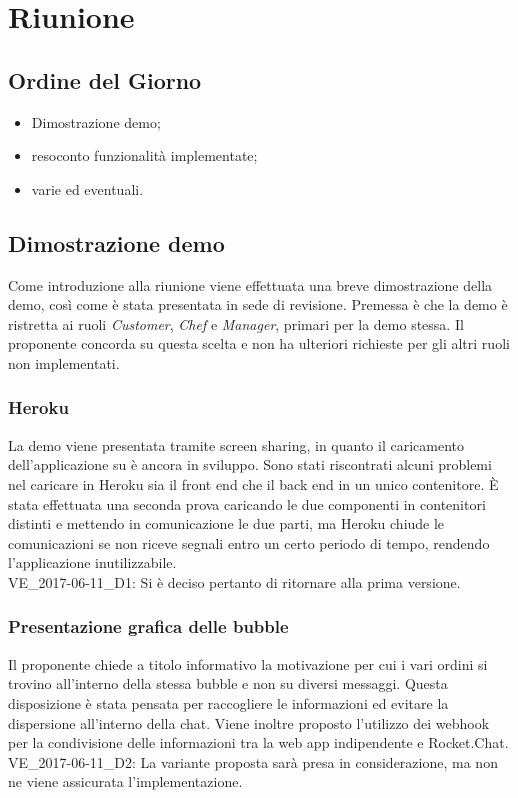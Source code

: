 \section{Riunione}
\subsection{Ordine del Giorno}
\begin{itemize}
	\item Dimostrazione demo;
	\item resoconto funzionalità implementate;
	\item varie ed eventuali.
\end{itemize}

\subsection{Dimostrazione demo}
Come introduzione alla riunione viene effettuata una breve dimostrazione della demo, così come è stata presentata in sede di revisione.
Premessa è che la demo è ristretta ai ruoli \textit{Customer}, \textit{Chef} e \textit{Manager}, primari per la demo stessa. Il proponente concorda su questa scelta e non ha ulteriori richieste per gli altri ruoli non implementati.

\subsubsection{Heroku}
La demo viene presentata tramite screen sharing, in quanto il caricamento dell'applicazione su  è ancora in sviluppo. Sono stati riscontrati alcuni problemi nel caricare in Heroku sia il front end che il back end in un unico contenitore. È stata effettuata una seconda prova caricando le due componenti in contenitori distinti e mettendo in comunicazione le due parti, ma Heroku chiude le comunicazioni se non riceve segnali entro un certo periodo di tempo, rendendo l'applicazione inutilizzabile.\\
VE\_2017-06-11\_D1: Si è deciso pertanto di ritornare alla prima versione.

\subsubsection{Presentazione grafica delle bubble}
Il proponente chiede a titolo informativo la motivazione per cui i vari ordini si trovino all'interno della stessa bubble e non su diversi messaggi. Questa disposizione è stata pensata per raccogliere le informazioni ed evitare la dispersione all'interno della chat. Viene inoltre proposto l'utilizzo dei webhook per la condivisione delle informazioni tra la web app indipendente e Rocket.Chat.\\
VE\_2017-06-11\_D2: La variante proposta sarà presa in considerazione, ma non ne viene assicurata l'implementazione.

